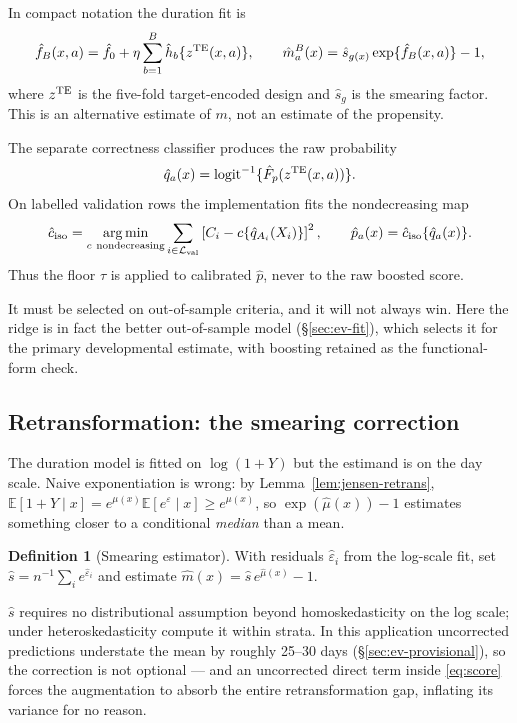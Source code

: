 \documentclass[11pt,a4paper]{article}
\theoremstyle{plain}
\theoremstyle{definition}
\newtheorem{definition}[theorem]{Definition}
\theoremstyle{remark}
\DeclareMathOperator*{\argmin}{arg\,min}
\newcommand{\E}{\mathbb E}
\begin{document}
In compact notation the duration fit is
\begin{equation}
\hat f_B(x,a)=\hat f_0+\eta\sum_{b=1}^{B}\hat h_b\{z^{\rm TE}(x,a)\},
\qquad
\hat m^B_a(x)=\hat s_{g(x)}\exp\{\hat f_B(x,a)\}-1,
\label{eq:boost-duration}
\end{equation}
where $z^{\rm TE}$ is the five-fold target-encoded design and $\hat s_g$ is the smearing factor.
This is an alternative estimate of $m$, not an estimate of the propensity.

The separate correctness classifier produces the raw probability
\[
\hat q_a(x)=\operatorname{logit}^{-1}\{\hat F_p(z^{\rm TE}(x,a))\}.
\]
On labelled validation rows the implementation fits the nondecreasing map
\begin{equation}
\hat c_{\rm iso}=\argmin_{c\ \mathrm{nondecreasing}}
\sum_{i\in\mathcal L_{\rm val}}
\left[C_i-c\{\hat q_{A_i}(X_i)\}\right]^2,
\qquad
\hat p_a(x)=\hat c_{\rm iso}\{\hat q_a(x)\}.
\label{eq:isotonic}
\end{equation}
Thus the floor $\tau$ is applied to calibrated $\hat p$, never to the raw boosted score.

It must be selected on out-of-sample criteria, and it will not always win. Here the ridge is in
fact the better out-of-sample model (\S\ref{sec:ev-fit}), which selects it for the primary
developmental estimate, with boosting retained as the functional-form check.

\subsection{Retransformation: the smearing correction}\label{sec:smear}

The duration model is fitted on $\log(1+Y)$ but the estimand is on the day scale. Naive
exponentiation is wrong: by Lemma~\ref{lem:jensen-retrans},
$\E[1+Y\mid x]=e^{\mu(x)}\E[e^\varepsilon\mid x]\ge e^{\mu(x)}$, so $\exp(\hat\mu(x))-1$
estimates something closer to a conditional \emph{median} than a mean.

\begin{definition}[Smearing estimator]\label{def:smear}
With residuals $\hat\varepsilon_i$ from the log-scale fit, set
$\hat s=n^{-1}\sum_ie^{\hat\varepsilon_i}$ and estimate $\hat m(x)=\hat s\,e^{\hat\mu(x)}-1$.
\end{definition}

$\hat s$ requires no distributional assumption beyond homoskedasticity on the log scale; under
heteroskedasticity compute it within strata. In this application uncorrected predictions
understate the mean by roughly 25--30 days (\S\ref{sec:ev-provisional}), so the correction is not
optional --- and an uncorrected direct term inside \eqref{eq:score} forces the augmentation to
absorb the entire retransformation gap, inflating its variance for no reason.
\end{document}
